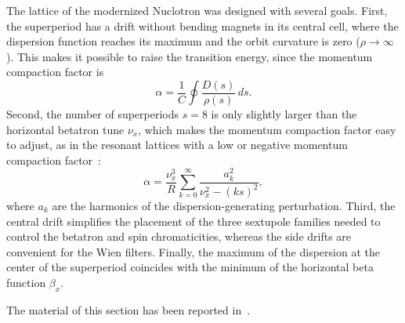 The lattice of the modernized Nuclotron was designed with several goals.
First, the superperiod has a drift without bending magnets in its central
cell, where the dispersion function reaches its maximum and the orbit
curvature is zero ($\rho\to\infty$). This makes it possible to raise the
transition energy, since the momentum compaction factor is
\begin{equation}
  \alpha = \frac{1}{C}\oint\frac{D(s)}{\rho(s)}\,ds .
\end{equation}
Second, the number of superperiods $s = 8$ is only slightly larger than the
horizontal betatron tune $\nu_x$, which makes the momentum compaction factor
easy to adjust, as in the resonant lattices with a low or negative momentum
compaction factor~\cite{Senichev:1997kn,Ishi:1998tj,Papaphilippou:2010zz,Senichev:2008zza,Toelle:2007zz}:
\begin{equation}
  \alpha = \frac{\nu_x^3}{R}\sum_{k=0}^{\infty}\frac{a_k^2}{\nu_x^2-(ks)^2},
\end{equation}
where $a_k$ are the harmonics of the dispersion-generating perturbation.
Third, the central drift simplifies the placement of the three sextupole
families needed to control the betatron and spin chromaticities, whereas the
side drifts are convenient for the Wien filters. Finally, the maximum of the
dispersion at the center of the superperiod coincides with the minimum of the
horizontal beta function $\beta_x$.

The material of this section has been reported
in~\cite{Senichev:2023vtx,Senichev:2024vhw,Senichev:2024fey,Senichev:2025ude,Senichev:2026xca,Kolokolchikov:2025sew,Senichev:2025jqf}.
